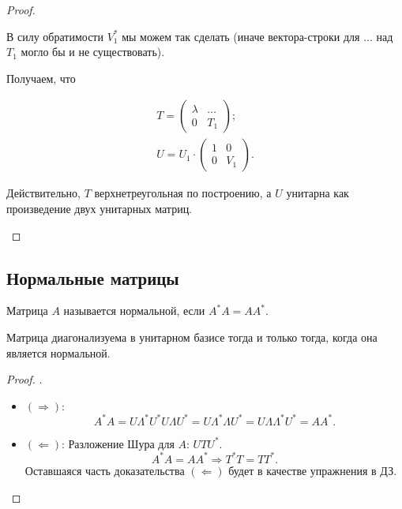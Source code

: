 \begin{proof}
\begin{induct}
        В силу обратимости $V_1^*$ мы можем так сделать (иначе вектора-строки
        для $\dots$ над $T_1$ могло бы и не существовать).

        Получаем, что

        \[
            \begin{array}{c}
                T = \begin{pmatrix}
                    \lambda & \dots \\
                    0 & T_1
                \end{pmatrix}; \\
                U = U_1 \cdot \begin{pmatrix}
                    1 & 0 \\
                    0 & V_1
                \end{pmatrix}.
            \end{array}
        \]

        Действительно, $T$ верхнетреугольная по построению, а $U$ унитарна как
        произведение двух унитарных матриц.
    \end{induct}
\end{proof}

\subsection{Нормальные матрицы}

\begin{definition}
    Матрица $A$ называется нормальной, если $A^* A = A A^*$.
\end{definition}

\begin{point}
    Матрица диагонализуема в унитарном базисе тогда и только тогда, когда она
    является нормальной.
\end{point}

\begin{proof}.

    \begin{itemize}
        \item $(\Rightarrow)$:
            \[
                A^* A = U \Lambda^* U^* U \Lambda U^* = U \Lambda^* \Lambda U^*
                = U \Lambda \Lambda^* U^* = A A^*.
            \]
        \item $(\Leftarrow)$: Разложение Шура для $A$: $U T U^*$.
            \[
                A^* A = A A^* \Rightarrow T^* T = T T^*.
            \]
            Оставшаяся часть доказательства $(\Leftarrow)$ будет в качестве
            упражнения в ДЗ.
    \end{itemize}
\end{proof}


